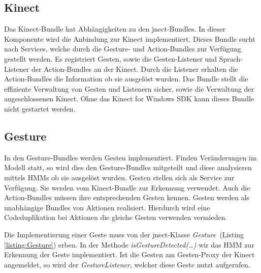 \subsection{Kinect}

Das Kinect-Bundle hat Abh\"angigkeiten zu den jnect-Bundles. In dieser Komponente wird die Anbindung zur Kinect implementiert. Dieses Bundle 
sucht nach Services, welche durch die Gesture- und Action-Bundles zur Verf\"ugung gestellt werden. Es registriert Gesten, sowie die 
Gesten-Listener und Sprach-Listener der Action-Bundles an der Kinect. Durch die Listener erhalten die Action-Bundles die Information 
ob sie ausgel\"ost wurden. Das Bundle stellt die effiziente Verwaltung von Gesten und Listenern sicher, sowie die Verwaltung der 
angeschlossenen Kinect. Ohne das Kinect for Windows \acrshort{SDK} kann dieses Bundle nicht gestartet werden.

\subsection{Gesture}

In den Gesture-Bundles werden Gesten implementiert. Finden Ver\"anderungen im Modell statt, so wird dies den Gesture-Bundles mitgeteilt und 
diese analysieren mittels HMMs ob sie ausgel\"ost wurden. Gesten stellen sich als Service zur Verf\"ugung. Sie werden vom Kinect-Bundle zur 
Erkennung verwendet. Auch die Action-Bundles m\"ussen ihre entsprechenden Gesten kennen. Gesten werden als unabh\"angige Bundles von Aktionen 
realisiert. Hierdurch wird eine Codeduplikation bei Aktionen die gleiche Gesten verwenden vermieden.

Die Implementierung einer Geste muss von der jnect-Klasse \textit{Gesture}~(Listing \ref{listing:Gesture}) erben. In der Methode 
\textit{isGestureDetected(\ldots)} wir das HMM zur Erkennung der Geste implementiert. Ist die Gesten am Gesten-Proxy der Kinect 
angemeldet, so wird der \textit{GestureListener}, welcher diese Geste nutzt aufgerufen.

\par\smallskip
\lstset{language=Java}

